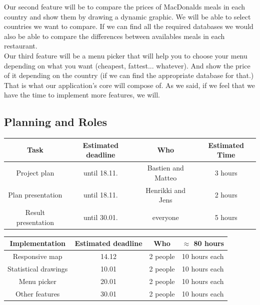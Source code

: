 \documentclass[12pt]{article}
\begin{document}
        \noindent Our second feature will be to compare the prices of MacDonalds meals
        in each country and show them by drawing a dynamic graphic. We will be
        able to select countries we want to compare. If we can find all the
        required databases we would also be able to compare the differences
        between availables meals in each restaurant.\\

        \noindent Our third feature will be a menu picker that will help you to choose
        your menu depending on what you want (cheapest, fattest... whatever).
        And show the price of it depending on the country (if we can find the
        appropriate database for that.)\\

        \noindent That is what our application's core will compose of. As we said, if we feel
        that we have the time to implement more features, we will.

        \newpage

        {\color{color_subsection}\subsection{Planning and Roles}}
        \vspace{1em}
           
	\begin{center}
	    \begin{tabular}{ |c|c|c|c| } 
 	        \hline
	        \textbf{Task} & \textbf{Estimated deadline} & \textbf{Who} & \textbf{Estimated Time}  \\
	        \hline
 	        Project plan & until 18.11. & Bastien and Matteo & 3 hours \\ 
 	        \hline
 	        Plan presentation & until 18.11. & Henrikki and Jens & 2 hours \\
            \hline 
            Result presentation & until 30.01. & everyone & 5 hours \\ 
            \hline 
        \end{tabular}
    \end{center}
    
    \begin{center}
        \begin{tabular}{ |c|c|c|c| } 
            \hline
            \textbf{Implementation} & \textbf{Estimated deadline} & \textbf{Who} & \textbf{$\approx$ 80 hours} \\
            \hline
            Responsive map & 14.12 & 2 people & 10 hours each \\
            \hline
 	        Statistical drawings & 10.01 & 2 people & 10 hours each\\  
            \hline
            Menu picker & 20.01 & 2 people & 10 hours each \\
            \hline
            Other features & 30.01 & 2 people & 10 hours each \\
	        \hline
	    \end{tabular}
    \end{center}
    
\end{document}

